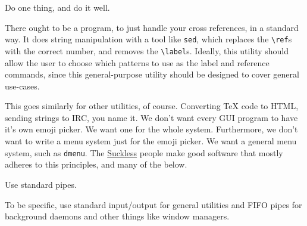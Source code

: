\documentclass[twocolumn]{article}
\newenvironment{bigpoint}
	{\begin{center}\begin{itshape}}
	{\end{itshape}\end{center}}
\newcommand{\program}[1]{\texttt{#1}}
\newcommand{\command}[1]{\texttt{#1}}
\begin{document}
\begin{bigpoint}
	Do one thing, and do it well.
\end{bigpoint}

There ought to be a program, to just handle your cross references, in a standard way. It does string manipulation with a tool like \command{sed}, which replaces the \verb|\ref|s with the correct number, and removes the \verb|\label|s. Ideally, this utility should allow the user to choose which patterns to use as the label and reference commands, since this general-purpose utility should be designed to cover general use-cases.

This goes similarly for other utilities, of course. Converting \TeX{} code to HTML, sending strings to IRC, you name it. We don't want every GUI program to have it's own emoji picker. We want one for the whole system. Furthermore, we don't want to write a menu system just for the emoji picker. We want a general menu system, such as \program{dmenu}. The \href{https://suckless.org}{Suckless} people make good software that mostly adheres to this principles, and many of the below.

\begin{bigpoint}
	Use standard pipes.
\end{bigpoint}

To be specific, use standard input/output for general utilities and FIFO pipes for background daemons and other things like window managers.
\end{document}
